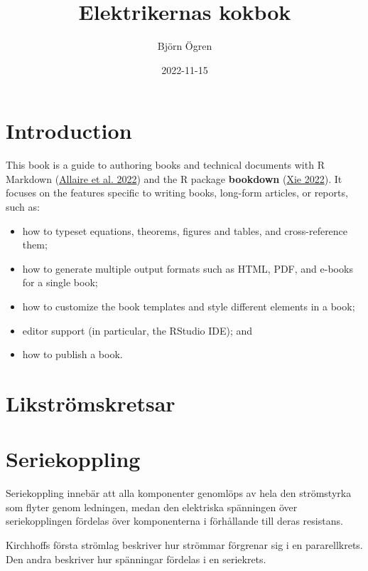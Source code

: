 \documentclass[
]{book}
\title{Elektrikernas kokbok}
\author{Björn Ögren}
\date{2022-11-15}
\providecommand{\tightlist}{%
  \setlength{\itemsep}{0pt}\setlength{\parskip}{0pt}}
\begin{document}
\frontmatter
\maketitle

\mainmatter
\hypertarget{introduction}{%
\chapter*{Introduction}\label{introduction}}

This book is a guide to authoring books and technical documents with R
Markdown (\protect\hyperlink{ref-R-rmarkdown}{Allaire et al. 2022}) and
the R package \textbf{bookdown} (\protect\hyperlink{ref-R-bookdown}{Xie
2022}). It focuses on the features specific to writing books, long-form
articles, or reports, such as:

\begin{itemize}
\tightlist
\item
  how to typeset equations, theorems, figures and tables, and
  cross-reference them;
\item
  how to generate multiple output formats such as HTML, PDF, and e-books
  for a single book;
\item
  how to customize the book templates and style different elements in a
  book;
\item
  editor support (in particular, the RStudio IDE); and
\item
  how to publish a book.
\end{itemize}

\hypertarget{likstruxf6mskretsar}{%
\chapter*{Likströmskretsar}\label{likstruxf6mskretsar}}

\hypertarget{seriekoppling}{%
\chapter{Seriekoppling}\label{seriekoppling}}

Seriekoppling innebär att alla komponenter genomlöps av hela den
strömstyrka som flyter genom ledningen, medan den elektriska spänningen
över seriekopplingen fördelas över komponenterna i förhållande till
deras resistans.

Kirchhoffs första strömlag beskriver hur strömmar förgrenar sig i en
pararellkrets. Den andra beskriver hur spänningar fördelas i en
seriekrets.
\end{document}
